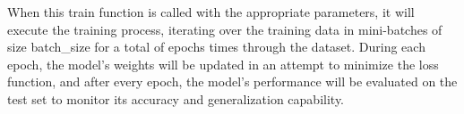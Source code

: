 When this train function is called with the appropriate parameters, it will execute the training process, iterating over the training data in mini-batches of size batch\_size for a total of epochs times through the dataset. During each epoch, the model's weights will be updated in an attempt to minimize the loss function, and after every epoch, the model's performance will be evaluated on the test set to monitor its accuracy and generalization capability.